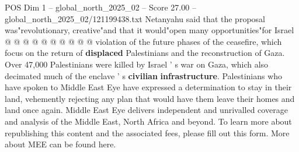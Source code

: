 \begin{textsample}{POS Dim 1 – global\_north\_2025\_02 – Score 27.00 – global\_north\_2025\_02/121199438.txt}
Netanyahu said that the proposal was"revolutionary, creative"and that it would"open many opportunities"for Israel @ @ @ @ @ @ @ @ @ @ violation of the future phases of the ceasefire, which focus on the return of \textbf{displaced} Palestinians and the reconstruction of Gaza.
Over 47,000 Palestinians were killed by Israel ' s war on Gaza, which also decimated much of the enclave ' s \textbf{civilian} \textbf{infrastructure}.
Palestinians who have spoken to Middle East Eye have expressed a determination to stay in their land, vehemently rejecting any plan that would have them leave their homes and land once again.
Middle East Eye delivers independent and unrivalled coverage and analysis of the Middle East, North Africa and beyond.
To learn more about republishing this content and the associated fees, please fill out this form.
More about MEE can be found here.

\end{textsample}
